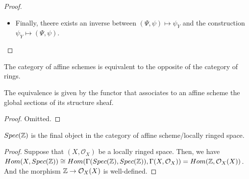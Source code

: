 \documentclass[Total.tex]{subfiles}
\begin{document}
\begin{proof}
\begin{itemize}
\begin{itemize}
						And $\Psi_Y(g)$ is invertible on $D(\Psi_Y(g))$. Thus we could extend $\Psi_Y$ to 
						\begin{gather*}
							\psi_{D(g)}:\Gamma(Y,\mathbb{O}_Y)_g\rightarrow \Gamma(\Psi^{-1}(D(g),\mathcal{O}_X))
						\end{gather*} 
						\item The morphism is local for stalks. Suppose the morphism is defined as
						\begin{gather*}
							(\Psi,\psi):(X,\mathcal{O}_X)\rightarrow (Y,\mathcal{O}_Y)
						\end{gather*} 
						
						Now, 
						\begin{gather*}
							\psi_x:\mathcal{O}_{Y,\Psi(x)}\rightarrow \mathcal{O}_{X,x}
						\end{gather*}
						
						it is local: \ref{algebraic-geometry-morphism-of-stalks-of-locally-ringed-spaces}
					\end{itemize}
					\item Finally, theere exists an inverse between $(\Psi,\psi)\mapsto \psi_Y$ and the construction $\psi_Y\mapsto (\Psi,\psi)$. 
				\end{itemize}
			\end{proof}
			
			\begin{corollary}
				The category of affine schemes is equivalent to the opposite of the category of rings.
				
				The equivalence is given by the functor that associates to an affine scheme the global sections of its structure sheaf.
			\end{corollary}
			\begin{proof}
				Omitted.
			\end{proof}
			
			\begin{corollary}
				$Spec(\mathbb{Z})$ is the final object in the category of affine scheme/locally ringed space.\label{algebraic-geometry-affine-scheme-specZ-is-final-object-of-locally-ringed-space}
			\end{corollary}
			\begin{proof}
				Suppose that $(X,\mathcal{O}_X)$ be a locally ringed space. Then, we have $Hom(X,Spec(\mathbb{Z}))\cong Hom(\Gamma(Spec(\mathbb{Z}),Spec(\mathbb{Z})),\Gamma(X,\mathcal{O}_X))=Hom(\mathbb{Z},\mathcal{O}_X(X))$. And the morphism $\mathbb{Z}\rightarrow \mathcal{O}_X(X)$ is well-defined.
			\end{proof}
\end{document}
